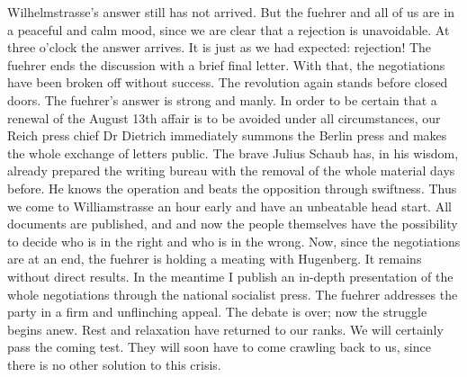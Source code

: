 Wilhelmstrasse's answer still has not arrived. But the fuehrer and all of us are in a peaceful and calm mood, since we are clear that a rejection is unavoidable. At three o'clock the answer arrives. It is just as we had expected: rejection! The fuehrer ends the discussion with a brief final letter. With that, the negotiations have been broken off without success. The revolution again stands before closed doors. The fuehrer's answer is strong and manly.
In order to be certain that a renewal of the August 13th affair is to be avoided under all circumstances, our Reich press chief Dr Dietrich immediately summons the Berlin press and makes the whole exchange of letters public. The brave Julius Schaub has, in his wisdom, already prepared the writing bureau with the removal of the whole material days before. He knows the operation and beats the opposition through swiftness. Thus we come to Williamstrasse an hour early and have an unbeatable head start. All documents are published, and and now the people themselves have the possibility to decide who is in the right and who is in the wrong. Now, since the negotiations are at an end, the fuehrer is holding a meating with Hugenberg. It remains without direct results. In the meantime I publish an in-depth presentation of the whole negotiations through the national socialist press. The fuehrer addresses the party in a firm and unflinching appeal. The debate is over; now the struggle begins anew. Rest and relaxation have returned to our ranks. We will certainly pass the coming test. They will soon have to come crawling back to us, since there is no other solution to this crisis.